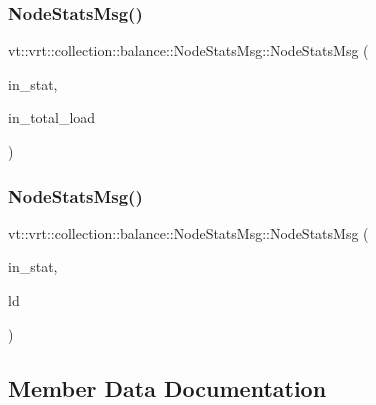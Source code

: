\subsubsection{\texorpdfstring{Node\+Stats\+Msg()}{NodeStatsMsg()}\hspace{0.1cm}{\footnotesize\ttfamily [2/3]}}
{\footnotesize\ttfamily vt\+::vrt\+::collection\+::balance\+::\+Node\+Stats\+Msg\+::\+Node\+Stats\+Msg (\begin{DoxyParamCaption}\item[{\hyperlink{namespacevt_1_1vrt_1_1collection_1_1lb_af0e20ef9afee77295053aa83bf1348b1}{lb\+::\+Statistic}}]{in\+\_\+stat,  }\item[{\hyperlink{namespacevt_a876a9d0cd5a952859c72de8a46881442}{Time\+Type} const}]{in\+\_\+total\+\_\+load }\end{DoxyParamCaption})\hspace{0.3cm}{\ttfamily [inline]}}

\mbox{\label{structvt_1_1vrt_1_1collection_1_1balance_1_1_node_stats_msg_a2ff50c69756cb7cbadc32aee9f2b0fb4}} 
\subsubsection{\texorpdfstring{Node\+Stats\+Msg()}{NodeStatsMsg()}\hspace{0.1cm}{\footnotesize\ttfamily [3/3]}}
{\footnotesize\ttfamily vt\+::vrt\+::collection\+::balance\+::\+Node\+Stats\+Msg\+::\+Node\+Stats\+Msg (\begin{DoxyParamCaption}\item[{\hyperlink{namespacevt_1_1vrt_1_1collection_1_1lb_af0e20ef9afee77295053aa83bf1348b1}{lb\+::\+Statistic}}]{in\+\_\+stat,  }\item[{\hyperlink{structvt_1_1vrt_1_1collection_1_1balance_1_1_load_data}{Load\+Data} \&\&}]{ld }\end{DoxyParamCaption})\hspace{0.3cm}{\ttfamily [inline]}}



\subsection{Member Data Documentation}
\mbox{\label{structvt_1_1vrt_1_1collection_1_1balance_1_1_node_stats_msg_a733572c8a92c1b72f059c99feecb02e3}} 
